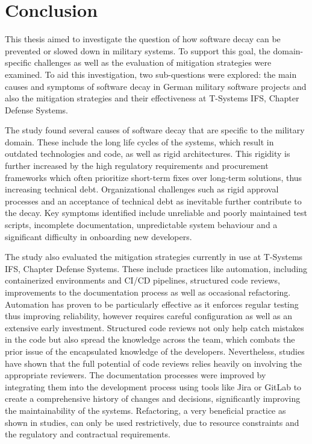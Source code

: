 \section{Conclusion}
This thesis aimed to investigate the question of how software decay can be prevented or slowed down in military systems. To support this goal, the domain-specific challenges as well as the evaluation of mitigation strategies were examined.
To aid this investigation, two sub-questions were explored: the main causes and symptoms of software decay in German military software projects and also the mitigation strategies and their effectiveness at T-Systems IFS, Chapter Defense Systems.

The study found several causes of software decay that are specific to the military domain. These include the long life cycles of the systems, which result in outdated technologies and code, as well as rigid architectures. This rigidity is further
increased by the high regulatory requirements and procurement frameworks which often prioritize short-term fixes over long-term solutions, thus increasing technical debt. Organizational challenges such as rigid approval processes
and an acceptance of technical debt as inevitable further contribute to the decay. Key symptoms identified include unreliable and poorly maintained test scripts, incomplete documentation, unpredictable system behaviour and a significant difficulty in onboarding new developers.

The study also evaluated the mitigation strategies currently in use at T-Systems IFS, Chapter Defense Systems. These include practices like automation, including containerized environments and CI/CD pipelines,
structured code reviews, improvements to the documentation process as well as occasional refactoring. Automation has proven to be particularly effective as it enforces regular testing thus improving reliability, however requires careful configuration as well as an extensive early investment.
Structured code reviews not only help catch mistakes in the code but also spread the knowledge across the team, which combats the prior issue of the encapsulated knowledge of the developers. Nevertheless, studies have shown that the full potential of code reviews relies heavily on involving the appropriate reviewers.
The documentation processes were improved by integrating them into the development process using tools like Jira or GitLab to create a comprehensive history of changes and decisions, significantly improving the maintainability of the systems.
Refactoring, a very beneficial practice as shown in studies, can only be used restrictively, due to resource constraints and the regulatory and contractual requirements.

